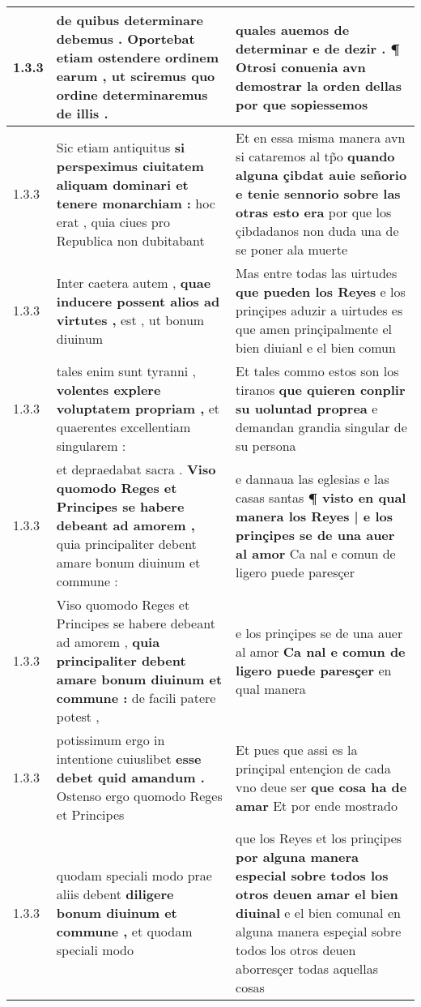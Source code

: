 \begin{tabular}{|p{1cm}|p{6.5cm}|p{6.5cm}|}
1.3.3 & de quibus determinare debemus . \textbf{ Oportebat etiam ostendere ordinem earum , } ut sciremus quo ordine determinaremus de illis . & quales auemos de determinar e de dezir . \textbf{ ¶ Otrosi conuenia avn demostrar la orden dellas } por que sopiessemos \\\hline
1.3.3 & Sic etiam antiquitus \textbf{ si perspeximus ciuitatem aliquam dominari et tenere monarchiam : } hoc erat , quia ciues pro Republica non dubitabant & Et en essa misma manera avn si cataremos al tp̃o \textbf{ quando alguna çibdat auie señorio e tenie sennorio sobre las otras esto era } por que los çibdadanos non duda una de se poner ala muerte \\\hline
1.3.3 & Inter caetera autem , \textbf{ quae inducere possent alios ad virtutes , } est , ut bonum diuinum & Mas entre todas las uirtudes \textbf{ que pueden los Reyes } e los prinçipes aduzir a uirtudes es que amen prinçipalmente el bien diuianl e el bien comun \\\hline
1.3.3 & tales enim sunt tyranni , \textbf{ volentes explere voluptatem propriam , } et quaerentes excellentiam singularem : & Et tales commo estos son los tiranos \textbf{ que quieren conplir su uoluntad proprea } e demandan grandia singular de su persona \\\hline
1.3.3 & et depraedabat sacra . \textbf{ Viso quomodo Reges et Principes se habere debeant ad amorem , } quia principaliter debent amare bonum diuinum et commune : & e dannaua las eglesias e las casas santas \textbf{ ¶ visto en qual manera los Reyes | e los prinçipes se de una auer al amor } Ca nal e comun de ligero puede paresçer \\\hline
1.3.3 & Viso quomodo Reges et Principes se habere debeant ad amorem , \textbf{ quia principaliter debent amare bonum diuinum et commune : } de facili patere potest , & e los prinçipes se de una auer al amor \textbf{ Ca nal e comun de ligero puede paresçer } en qual manera \\\hline
1.3.3 & potissimum ergo in intentione cuiuslibet \textbf{ esse debet quid amandum . } Ostenso ergo quomodo Reges et Principes & Et pues que assi es la prinçipal entençion de cada vno deue ser \textbf{ que cosa ha de amar } Et por ende mostrado \\\hline
1.3.3 & quodam speciali modo prae aliis debent \textbf{ diligere bonum diuinum et commune , } et quodam speciali modo & que los Reyes et los prinçipes \textbf{ por alguna manera especial sobre todos los otros deuen amar el bien diuinal } e el bien comunal en alguna manera espeçial sobre todos los otros deuen aborresçer todas aquellas cosas \\\hline

\end{tabular}
